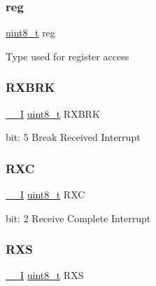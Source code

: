 \subsubsection{\texorpdfstring{reg}{reg}}
{\footnotesize\ttfamily \mbox{\hyperlink{union_s_e_r_c_o_m___u_s_a_r_t___i_n_t_f_l_a_g___type_a5b4208c6f4c4a4290c4f2804d1eb1d5b}{uint8\+\_\+t}} reg}

Type used for register access \mbox{\label{union_s_e_r_c_o_m___u_s_a_r_t___i_n_t_f_l_a_g___type_a6ca47401273f527213810e32cd389973}} 
\subsubsection{\texorpdfstring{RXBRK}{RXBRK}}
{\footnotesize\ttfamily \mbox{\hyperlink{core__cm0plus_8h_af63697ed9952cc71e1225efe205f6cd3}{\+\_\+\+\_\+I}} \mbox{\hyperlink{union_s_e_r_c_o_m___u_s_a_r_t___i_n_t_f_l_a_g___type_a5b4208c6f4c4a4290c4f2804d1eb1d5b}{uint8\+\_\+t}} R\+X\+B\+RK}

bit\+: 5 Break Received Interrupt \mbox{\label{union_s_e_r_c_o_m___u_s_a_r_t___i_n_t_f_l_a_g___type_a6a70680cf18df53069f66ae6df6506ff}} 
\subsubsection{\texorpdfstring{RXC}{RXC}}
{\footnotesize\ttfamily \mbox{\hyperlink{core__cm0plus_8h_af63697ed9952cc71e1225efe205f6cd3}{\+\_\+\+\_\+I}} \mbox{\hyperlink{union_s_e_r_c_o_m___u_s_a_r_t___i_n_t_f_l_a_g___type_a5b4208c6f4c4a4290c4f2804d1eb1d5b}{uint8\+\_\+t}} R\+XC}

bit\+: 2 Receive Complete Interrupt \mbox{\label{union_s_e_r_c_o_m___u_s_a_r_t___i_n_t_f_l_a_g___type_a39bb36a17d91822627c26724dd21ad31}} 
\subsubsection{\texorpdfstring{RXS}{RXS}}
{\footnotesize\ttfamily \mbox{\hyperlink{core__cm0plus_8h_af63697ed9952cc71e1225efe205f6cd3}{\+\_\+\+\_\+I}} \mbox{\hyperlink{union_s_e_r_c_o_m___u_s_a_r_t___i_n_t_f_l_a_g___type_a5b4208c6f4c4a4290c4f2804d1eb1d5b}{uint8\+\_\+t}} R\+XS}

